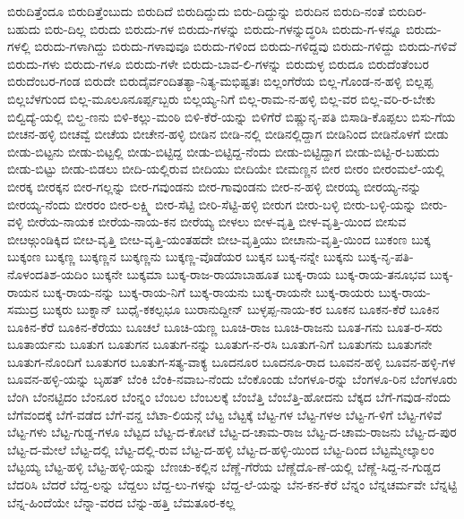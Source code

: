 {ಬಿರುದಿತ್ತೆಂದೂ
ಬಿರುದಿತ್ತೆಂಬುದು
ಬಿರುದಿದೆ
ಬಿರುದಿದ್ದುದು
ಬಿರು-ದಿದ್ದುನ್ನು
ಬಿರುದಿನ
ಬಿರುದಿ-ನಂತೆ
ಬಿರುದಿರ-ಬಹುದು
ಬಿರು-ದಿಲ್ಲ
ಬಿರುದು
ಬಿರುದು-ಗಳ
ಬಿರುದು-ಗಳನ್ನು
ಬಿರುದು-ಗಳನ್ನುದ್ಧರಿಸಿ
ಬಿರುದು-ಗ-ಳನ್ನೂ
ಬಿರುದು-ಗಳಲ್ಲಿ
ಬಿರುದು-ಗಳಾಗಿದ್ದು
ಬಿರುದು-ಗಳಾವುವೂ
ಬಿರುದು-ಗಳಿಂದ
ಬಿರುದು-ಗಳಿದ್ದವು
ಬಿರುದು-ಗಳಿದ್ದು
ಬಿರುದು-ಗಳಿವೆ
ಬಿರುದು-ಗಳು
ಬಿರುದು-ಗಳೂ
ಬಿರುದು-ಗಳೇ
ಬಿರುದು-ಬಾವ-ಲಿ-ಗಳನ್ನು
ಬಿರುದುಳ್ಳ
ಬಿರುದೂ
ಬಿರುದೆಂತೆಂಬರ
ಬಿರುದೆಂಬರ-ಗಂಡ
ಬಿರುದೇ
ಬಿರುದೈರ್ವಂದಿತತ್ಯಾ-ನಿತ್ಯ-ಮಭಿಷ್ಟತಃ
ಬಿಲ್ಲಂಗೆರೆಯ
ಬಿಲ್ಲ-ಗೊಂಡ-ನ-ಹಳ್ಳಿ
ಬಿಲ್ಲಪ್ಪ
ಬಿಲ್ಲಬೆಳಗುಂದ
ಬಿಲ್ಲ-ಮೂಲೂನೂರ್ಪ್ಪಬ್ಬರು
ಬಿಲ್ಲಯ್ಯ-ನಿಗೆ
ಬಿಲ್ಲ-ರಾಮ-ನ-ಹಳ್ಳಿ
ಬಿಲ್ಲ-ವರ
ಬಿಲ್ಲ-ವರಿ-ರ-ಬೇಕು
ಬಿಲ್ವಿದ್ಯೆ-ಯಲ್ಲಿ
ಬಿಲ್ಹ-ಣನು
ಬಿಳಿ-ಕಲ್ಲು-ಮಂಠಿ
ಬಿಳಿ-ಕೆರೆ-ಯನ್ನು
ಬಿಳಿಗೆರೆ
ಬಿಷ್ಣುನೃ-ಪತಿ
ಬಿಸಾಡಿ-ಕೊಪ್ಪಲು
ಬಿಸು-ಗೆಯ
ಬೀಚನ-ಹಳ್ಳಿ
ಬೀಚವ್ವೆ
ಬೀಚೆಯ
ಬೀಚೇನ-ಹಳ್ಳಿ
ಬೀಡಿನ
ಬೀಡಿ-ನಲ್ಲಿ
ಬೀಡಿನಲ್ಲಿದ್ದಾಗ
ಬೀಡಿನಿಂದ
ಬೀಡಿನೊಳಗೆ
ಬೀಡು
ಬೀಡು-ಬಿಟ್ಟನು
ಬೀಡು-ಬಿಟ್ಟಲ್ಲಿ
ಬೀಡು-ಬಿಟ್ಟಿದ್ದ
ಬೀಡು-ಬಿಟ್ಟಿದ್ದ-ನೆಂದು
ಬೀಡು-ಬಿಟ್ಟಿದ್ದಾಗ
ಬೀಡು-ಬಿಟ್ಟಿ-ರ-ಬಹುದು
ಬೀಡು-ಬಿಟ್ಟು
ಬೀಡು-ಬಿಡಲು
ಬೀದಿ-ಯಲ್ಲಿರುವ
ಬೀದಿಯು
ಬೀದಿಯೇ
ಬೀಮಣ್ಣನ
ಬೀರ
ಬೀರಂ
ಬೀರಂಮಲೆ-ಯಲ್ಲಿ
ಬೀರಕ್ಕ
ಬೀರಕ್ಕನ
ಬೀರ-ಗಲ್ಲನ್ನು
ಬೀರ-ಗವುಂಡನು
ಬೀರ-ಗಾವುಂಡನು
ಬೀರ-ನ-ಹಳ್ಳಿ
ಬೀರಯ್ಯ
ಬೀರಯ್ಯ-ನನ್ನು
ಬೀರಯ್ಯ-ನೆಂದು
ಬೀರರಂ
ಬೀರ-ಲಕ್ಷ್ಮಿ
ಬೀರ-ಸೆಟ್ಟಿ
ಬೀರಿ-ಸೆಟ್ಟಿ-ಹಳ್ಳಿ
ಬೀರುಗ
ಬೀರು-ಬಳ್ಳಿ
ಬೀರು-ಬಳ್ಳಿ-ಯನ್ನು
ಬೀರು-ವಳ್ಳಿ
ಬೀರೆಯ-ನಾಯಕ
ಬೀರೆಯ-ನಾಯ-ಕನ
ಬೀರೆಯ್ಯ
ಬೀಳಲು
ಬೀಳ-ವೃತ್ತಿ
ಬೀಳ-ವೃತ್ತಿ-ಯಿಂದ
ಬೀಸುವ
ಬೀೞಅ್ಗುಂಡಿಕ್ಕಿದ
ಬೀೞ-ವೃತ್ತಿ
ಬೀೞ-ವೃತ್ತಿ-ಯಂತಹದೇ
ಬೀೞ-ವೃತ್ತಿಯು
ಬೀೞಾನು-ವೃತ್ತಿ-ಯಿಂದ
ಬುಕಂಣ
ಬುಕ್ಕ
ಬುಕ್ಕಂಣ
ಬುಕ್ಕಣ್ಣ
ಬುಕ್ಕಣ್ಣನ
ಬುಕ್ಕಣ್ಣನು
ಬುಕ್ಕಣ್ಣ-ವೊಡೆಯರ
ಬುಕ್ಕನ
ಬುಕ್ಕ-ನನ್ನೇ
ಬುಕ್ಕನು
ಬುಕ್ಕ-ನೃ-ಪತಿ-ನೊಳಂದತಿಶ-ಯದಿಂ
ಬುಕ್ಕನೇ
ಬುಕ್ಕಮಾ
ಬುಕ್ಕ-ರಾಜ-ರಾಯಾಬಾಹೂತ
ಬುಕ್ಕ-ರಾಯ
ಬುಕ್ಕ-ರಾಯ-ತನೂಭವ
ಬುಕ್ಕ-ರಾಯನ
ಬುಕ್ಕ-ರಾಯ-ನನ್ನು
ಬುಕ್ಕ-ರಾಯ-ನಿಗೆ
ಬುಕ್ಕ-ರಾಯನು
ಬುಕ್ಕ-ರಾಯನೇ
ಬುಕ್ಕ-ರಾಯರು
ಬುಕ್ಕ-ರಾಯ-ಸಮುದ್ರ
ಬುಕ್ಕರು
ಬುಕ್ನಾನ್
ಬುಧೈ-ಕಕಲ್ಪಭೂ
ಬುರಾನುದ್ದೀನ್
ಬುಳ್ಳಪ್ಪ-ನಾಯ-ಕರ
ಬೂಕನ
ಬೂಕನ-ಕೆರೆ
ಬೂಕಿನ
ಬೂಕಿನ-ಕೆರೆ
ಬೂಕಿನ-ಕೆರೆಯು
ಬೂಚಲೆ
ಬೂಚಿ-ಯಣ್ಣ
ಬೂಚಿ-ರಾಜ
ಬೂಚಿ-ರಾಜನು
ಬೂತ-ಗನು
ಬೂತ-ರ-ಸರು
ಬೂತಾರ್ಯನು
ಬೂತುಗ
ಬೂತುಗನ
ಬೂತುಗ-ನನ್ನು
ಬೂತುಗ-ನ-ರಸಿ
ಬೂತುಗ-ನಿಗೆ
ಬೂತುಗನು
ಬೂತುಗನೇ
ಬೂತುಗ-ನೊಂದಿಗೆ
ಬೂತುಗರ
ಬೂತುಗ-ಸತ್ಯ-ವಾಕ್ಯ
ಬೂದನೂರ
ಬೂದನೂ-ರಾದ
ಬೂವನ-ಹಳ್ಳಿ
ಬೂವನ-ಹಳ್ಳಿ-ಗಳ
ಬೂವನ-ಹಳ್ಳಿ-ಯನ್ನು
ಬೃಹತ್
ಬೆಂಕಿ
ಬೆಂಕಿ-ನವಾಬ-ನೆಂದು
ಬೆಂಕೊಂಡು
ಬೆಂಗಳೂ-ರನ್ನು
ಬೆಂಗಳೂ-ರಿನ
ಬೆಂಗಳೂರು
ಬೆಂಗಿ
ಬೆಂನಟ್ಟಿದಂ
ಬೆಂನೂರ
ಬೆಂನ್ನಂ
ಬೆಂಬಲ
ಬೆಂಬಲಕ್ಕೆ
ಬೆಂಬೆತ್ತಿ
ಬೆಂಬೆತ್ತಿ-ಹೋದನು
ಬೆಕ್ಕದ
ಬೆಗೆ-ಗವುಡ-ನೆಂದು
ಬೆಗೆವಂದಕ್ಕೆ
ಬೆಗೆ-ವಡೆದ
ಬೆಗೆ-ವನ್ದ
ಬೆಟಾ-ಲಿಯನ್ಗೆ
ಬೆಟ್ಟ
ಬೆಟ್ಟಕ್ಕೆ
ಬೆಟ್ಟ-ಗಳ
ಬೆಟ್ಟ-ಗಳಅ
ಬೆಟ್ಟ-ಗ-ಳಿಗೆ
ಬೆಟ್ಟ-ಗಳಿವೆ
ಬೆಟ್ಟ-ಗಳು
ಬೆಟ್ಟ-ಗುಡ್ಡ-ಗಳೂ
ಬೆಟ್ಟದ
ಬೆಟ್ಟ-ದ-ಕೋಟೆ
ಬೆಟ್ಟ-ದ-ಚಾಮ-ರಾಜ
ಬೆಟ್ಟ-ದ-ಚಾಮ-ರಾಜನು
ಬೆಟ್ಟ-ದ-ಪುರ
ಬೆಟ್ಟ-ದ-ಮೇಲೆ
ಬೆಟ್ಟ-ದಲ್ಲಿ
ಬೆಟ್ಟ-ದಲ್ಲಿ-ರುವ
ಬೆಟ್ಟ-ದ-ಹಳ್ಳಿ
ಬೆಟ್ಟ-ದ-ಹಳ್ಳಿ-ಯಿಂದ
ಬೆಟ್ಟ-ದಿಂದ
ಬೆಟ್ಟಮ್ಮೇಲ್ಕಾಲಂ
ಬೆಟ್ಟಯ್ಯ
ಬೆಟ್ಟ-ಹಳ್ಳಿ
ಬೆಟ್ಟ-ಹಳ್ಳಿ-ಯನ್ನು
ಬೆಣಚು-ಕಲ್ಲಿನ
ಬೆಣ್ಣೆ-ಗೆರೆಯ
ಬೆಣ್ಣೆದೊ-ಣೆ-ಯಲ್ಲಿ
ಬೆಣ್ಣೆ-ಸಿದ್ದ-ನ-ಗುಡ್ಡದ
ಬೆದರಿಸಿ
ಬೆದರೆ
ಬೆದ್ದ-ಲನ್ನು
ಬೆದ್ದಲು
ಬೆದ್ದ-ಲು-ಗಳನ್ನು
ಬೆದ್ದ-ಲೆ-ಯನ್ನು
ಬೆನ-ಕನ-ಕೆರೆ
ಬೆನ್ನಂ
ಬೆನ್ನಚರ್ಮವೇ
ಬೆನ್ನಟ್ಟಿ
ಬೆನ್ನ-ಹಿಂದೆಯೇ
ಬೆನ್ನಾ-ವರದ
ಬೆನ್ನು-ಹತ್ತಿ
ಬೆಮತೂರ-ಕಲ್ಲ
}
